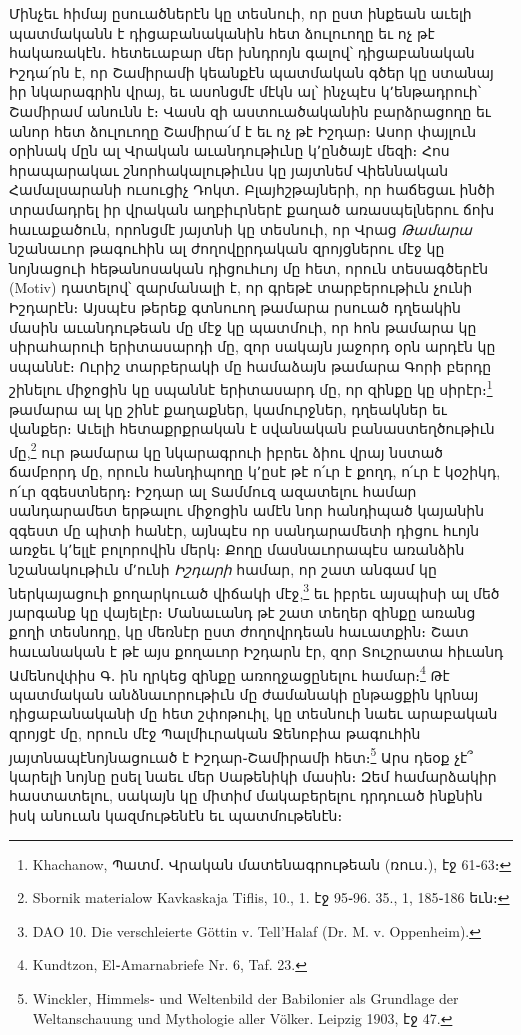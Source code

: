 \documentclass{article}
\begin{document}
{Մինչեւ հիմայ ըսուածներէն կը տեսնուի, որ ըստ ինքեան աւելի պատմականն է դիցաբանականին հետ ձուլուողը եւ ոչ թէ հակառակէն․ հետեւաբար մեր խնդրոյն գալով՝ դիցաբանական Իշդա՛րն է, որ Շամիրամի կեանքէն պատմական գծեր կը ստանայ իր նկարագրին վրայ, եւ ասոնցմէ մէկն ալ՝ ինչպէս կ՚ենթադրուի՝ Շամիրամ անունն է։ Վասն զի աստուածականին բարձրացողը եւ անոր հետ ձուլուողը Շամիրա՛մ է եւ ոչ թէ Իշդար։ Ասոր փայլուն օրինակ մըն ալ Վրական աւանդութիւնը կ՚ընծայէ մեզի։ Հոս հրապարակաւ շնորհակալութիւնս կը յայտնեմ Վիեննական Համալսարանի ուսուցիչ Դոկտ․ Բլայհշթայների, որ հաճեցաւ ինծի տրամադրել իր վրական աղբիւրներէ քաղած առասպելներու ճոխ հաւաքածուն, որոնցմէ յայտնի կը տեսնուի, որ Վրաց \emph{Թամարա} նշանաւոր թագուհին ալ ժողովըրդական զրոյցներու մէջ կը նոյնացուի հեթանոսական դիցուհւոյ մը հետ, որուն տեսագծերէն (Motiv) դատելով՝ զարմանալի է, որ գրեթէ տարբերութիւն չունի Իշդարէն։ Այսպէս թերեք գտնուող թամարա րսուած դղեակին մասին աւանդութեան մը մէջ կը պատմուի, որ հոն թամարա կը սիրահարուի երիտասարդի մը, զոր սակայն յաջորդ օրն արդէն կը սպաննէ։ Ուրիշ տարբերակի մը համաձայն թամարա Գորի բերդը շինելու միջոցին կը սպաննէ երիտասարդ մը, որ զինքը կը սիրէր։\footnote{Khachanow, Պատմ․ Վրական մատենագրութեան (ռուս․), էջ 61֊63։} թամարա ալ կը շինէ քաղաքներ, կամուրջներ, դղեակներ եւ վանքեր։ Աւելի հետաքրքրական է սվանական բանաստեղծութիւն մը,\footnote{Sbornik materialow Kavkaskaja Tiflis, 10., 1. էջ 95֊96. 35., 1, 185֊186 եւն։} ուր թամարա կը նկարագրուի իբրեւ ձիու վրայ նստած ճամբորդ մը, որուն հանդիպողը կ՚ըսէ թէ ո՛ւր է քողդ, ո՛ւր է կօշիկդ, ո՛ւր զգեստներդ։ Իշդար ալ Տամմուզ ազատելու համար սանդարամետ երթալու միջոցին ամէն նոր հանդիպած կայանին զգեստ մը պիտի հանէր, այնպէս որ սանդարամետի դիցու հւոյն առջեւ կ՚ելլէ բոլորովին մերկ։ Քողը մասնաւորապէս առանձին նշանակութիւն մ՚ունի \emph{Իշդարի} համար, որ շատ անգամ կը ներկայացուի քողարկուած վիճակի մէջ,\footnote{DAO 10. Die verschleierte Göttin v. Tell'Halaf (Dr. M. v. Oppenheim).} եւ իբրեւ այսպիսի ալ մեծ յարգանք կը վայելէր։ Մանաւանդ թէ շատ տեղեր զինքը առանց քողի տեսնոդը, կը մեռնէր ըստ ժողովրդեան հաւատքին։ Շատ հաւանական է թէ այս քողաւոր Իշդարն էր, զոր Տուշրատա հիւանդ Ամենովփիս Գ․ ին ղրկեց զինքը առողջացընելու համար։\footnote{Kundtzon, El֊Amarnabriefe Nr. 6, Taf. 23.} Թէ պատմական անձնաւորութիւն մը ժամանակի ընթացքին կրնայ դիցաբանականի մը հետ շփոթուիլ, կը տեսնուի նաեւ արաբական զրոյցէ մը, որուն մէջ Պալմիւրական Ջենոբիա թագուհին յայտնապէնոյնացուած է Իշդար֊Շամիրամի հետ։\footnote{Winckler, Himmels֊ und Weltenbild der Babilonier als Grundlage der Weltanschauung und Mythologie aller Völker. Leipzig 1903, էջ 47.} Արս դեօք չէ՞ կարելի նոյնը ըսել նաեւ մեր Սաթենիկի մասին։ Զեմ համարձակիր հաստատելու, սակայն կը միտիմ մակաբերելու դրդուած ինքնին իսկ անուան կազմութենէն եւ պատմութենէն։

}
\end{document}
